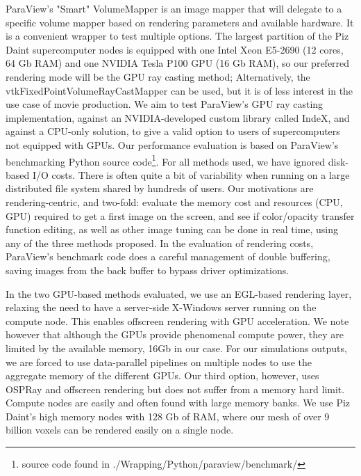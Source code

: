 \documentclass[final,5p,times,twocolumn]{elsarticle}
\begin{document}
ParaView's "Smart" VolumeMapper is an image mapper
that will delegate to a specific volume mapper based on rendering parameters and
available hardware. It is a convenient
wrapper to test multiple options. The largest partition of the Piz Daint supercomputer
nodes is equipped with one Intel Xeon E5-2690 (12 cores, 64 Gb RAM) and one NVIDIA
Tesla P100 GPU (16 Gb RAM), so our preferred rendering mode will be the GPU ray
casting method;
Alternatively, the vtkFixedPointVolumeRayCastMapper can be used, but it is of
less interest in the use case of movie production. We aim to test ParaView's GPU
ray casting implementation, against an NVIDIA-developed custom library called
IndeX, and against a CPU-only solution, to give a valid option to users of
supercomputers not equipped with GPUs.
Our performance evaluation is based on ParaView's benchmarking Python source
code\footnote{source code found in ./Wrapping/Python/paraview/benchmark/}.
\newline
For all methods used, we have ignored disk-based I/O costs. There is often quite
a bit of variability when running on a large distributed file system shared by
hundreds of users. Our motivations are rendering-centric, and two-fold:
evaluate the memory cost and resources (CPU, GPU) required to get a first image
on the screen, and see if color/opacity transfer
function editing, as well as other image tuning can be done in real time, using
any of the three methods proposed. In the evaluation of rendering costs, ParaView's
benchmark code does a careful management of double buffering, saving images from
the back buffer to bypass driver optimizations.

In the two GPU-based methods evaluated, we use an EGL-based rendering layer,
relaxing the need to have a server-side X-Windows server running on the compute node.
This enables offscreen rendering with GPU acceleration. We note however that although
the GPUs provide phenomenal compute power, they are limited by the available memory,
16Gb in our case. For our simulations outputs, we are forced to use data-parallel
pipelines on multiple nodes to use the aggregate memory of the different GPUs.
\newline
Our third option, however, uses OSPRay and offscreen rendering but does not suffer
from a memory hard limit. Compute nodes are easily and often found with large memory
banks. We use Piz Daint's high memory nodes with 128 Gb of RAM, where our mesh of
over 9 billion voxels can be rendered easily on a single node.
\end{document}
